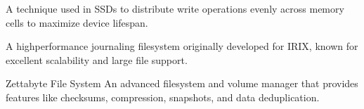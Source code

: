 \documentclass[letterpaper,10pt,english]{sphinxmanual}
\begin{document}
\begin{description}
\sphinxAtStartPar
A technique used in SSDs to distribute write operations evenly across memory cells to maximize device lifespan.

\sphinxAtStartPar
A high\sphinxhyphen{}performance journaling filesystem originally developed for IRIX, known for excellent scalability and large file support.

\sphinxAtStartPar
Zettabyte File System \sphinxhyphen{} An advanced filesystem and volume manager that provides features like checksums, compression, snapshots, and data deduplication.

\end{description}
\end{document}
